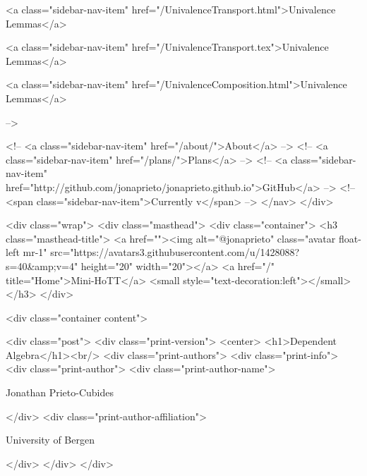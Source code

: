       
    
      
        
          <a class="sidebar-nav-item" href="/UnivalenceTransport.html">Univalence Lemmas</a>
        
      
    
      
        
          <a class="sidebar-nav-item" href="/UnivalenceTransport.tex">Univalence Lemmas</a>
        
      
    
      
        
          <a class="sidebar-nav-item" href="/UnivalenceComposition.html">Univalence Lemmas</a>
        
      
     -->

    <!-- <a class="sidebar-nav-item" href="/about/">About</a> -->
    <!-- <a class="sidebar-nav-item" href="/plans/">Plans</a> -->
    <!-- <a class="sidebar-nav-item" href="http://github.com/jonaprieto/jonaprieto.github.io">GitHub</a> -->
    <!-- <span class="sidebar-nav-item">Currently v</span> -->
  </nav>
</div>

    <div class="wrap">
      <div class="masthead">
        <div class="container">
          <h3 class="masthead-title">
            <a href=""><img alt="@jonaprieto" class="avatar float-left mr-1" src="https://avatars3.githubusercontent.com/u/1428088?s=40&amp;v=4" height="20" width="20"></a>
            <a href="/" title="Home">Mini-HoTT</a>
            <small style="text-decoration:left"></small>
          </h3>
        </div>
      
      <div class="container content">
        







<div class="post">
  <div class="print-version">
    <center>
      <h1>Dependent Algebra</h1><br/>
        <div class="print-authors">
          <div class="print-info">
            <div class="print-author">
              <div class="print-author-name">
                
                  Jonathan Prieto-Cubides
                
              </div>
              <div class="print-author-affiliation">
                
                  University of Bergen
                
                </div>
            </div>
          </div>
          
